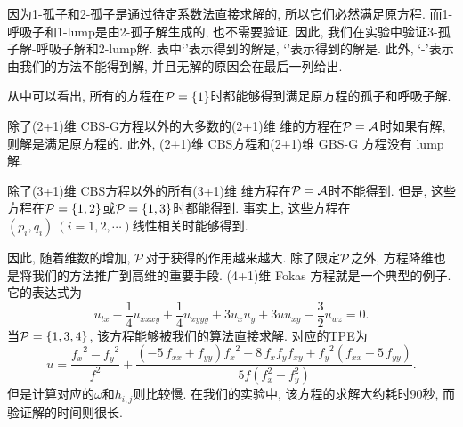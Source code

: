 因为1-孤子和2-孤子是通过待定系数法直接求解的, 所以它们必然满足原方程. 而1-呼吸子和1-lump是由2-孤子解生成的, 也不需要验证. 因此, 我们在实验中验证3-孤子解-呼吸子解和2-lump解. 表中`\VTRUE'表示得到的解是\TrueSol{}, `\VFALSE'表示得到的解是\FalseSol{}. 此外, `-'表示由我们的方法不能得到解, 并且无解的原因会在最后一列给出. 

从中可以看出, 所有的方程在$\mathcal{P}=\{1\}$时都能够得到满足原方程的孤子和呼吸子解. 

除了(2+1)维 CBS-G方程以外的大多数的(2+1)维 维的方程在$\mathcal{P}= \mathcal{A}$时如果有解, 则解是满足原方程的. 此外, (2+1)维 CBS方程和(2+1)维 GBS-G 方程没有 lump 解. 

除了(3+1)维 CBS方程以外的所有(3+1)维 维方程在$\mathcal{P}= \mathcal{A}$时不能得到\TrueSol{}. 但是, 这些方程在$\mathcal{P}=\{1,2\}$或$\mathcal{P}=\{1,3\}$时都能得到\TrueSol{}. 事实上, 这些方程在$(p_i,q_i)~(i=1,2,\cdots)$线性相关时能够得到\TrueSol{}.

因此, 随着维数的增加, $\mathcal{P}$对于获得\TrueSol{}的作用越来越大. 除了限定$\mathcal{P}$之外, 方程降维也是将我们的方法推广到高维的重要手段. (4+1)维 Fokas 方程\CITEdaFokas{}就是一个典型的例子. 它的表达式为
\begin{equation}
    u_{tx}-\frac{1}{4}u_{xxxy}+\frac{1}{4}u_{xyyy}+3u_xu_y+3uu_{xy}-\frac{3}{2}u_{wz}=0. \label{Fokas}
\end{equation}
当$\mathcal{P}=\{1,3,4\}$, 该方程能够被我们的算法直接求解. 对应的TPE为
\begin{equation}
u={\frac {{f_{{x}}}^{2}-{f_{{y}}}^{2}}{{f}^{2}}}+{\frac { \left( -5\,f_{
{{ xx}}}+f_{{{ yy}}} \right) {f_{{x}}}^{2}+8\,f_{{x}}f_{{y}}f_{{
{ xy}}}+{f_{{y}}}^{2} \left( f_{{{ xx}}}-5\,f_{{{ yy}}}
\right) }{5f(f_x^2-f_y^2)}}.
\end{equation}
但是计算对应的$\omega$和$h_{i,j}$则比较慢. 在我们的实验中, 该方程的求解大约耗时90秒, 而验证解的时间则很长. 

